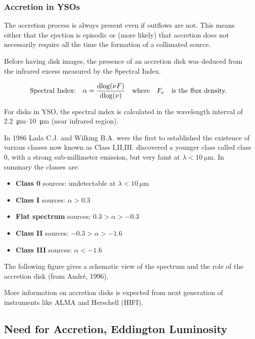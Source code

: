 \documentclass[10pt,a4paper,english]{article}
\begin{document}
\subsubsection{Accretion in YSOs}

The accretion process is always present even if outflows are not. This means
either that the ejection is episodic or (more likely) that accretion does not
necessarily require all the time the formation of a collimated source.

Before having disk images, the presence of an accretion disk was deduced from
the infrared excess measured by the Spectral Index.

\[
    \text{Spectral Index:}\quad \alpha=\frac{\mathrm{d}{\log(\nu F)}}{\mathrm{d}{
    \log(\nu)}}\quad\text{where}\quad F_{\nu}\quad\text{is the flux density.}
\]


For disks in YSO, the spectral index is calculated in the wavelength interval
of \SIrange{2.2}{10}{\um} (near infrared region).

In 1986 Lada C.J. and Wilking B.A. were the first to established the existence
of various classes now known as Class I,II,III. \cite{1993ApJ...406..122A}
discovered a younger class called class 0, with a strong sub-millimeter
emission, but very faint at $\lambda<\SI{10}{\um}$. In summary the classes are:
\begin{itemize}
    \item \textbf{Class 0} sources: undetectable at $\lambda<\SI{10}{\um}$
    \item \textbf{Class I} sources: $\alpha>0.3$
    \item \textbf{Flat spectrum} sources: $0.3>\alpha>-0.3$
    \item \textbf{Class II} sources: $-0.3>\alpha>-1.6$
    \item \textbf{Class III} sources: $\alpha<-1.6$
\end{itemize}

The following figure gives a schematic view of the spectrum and the role of the
accretion disk (from André, 1996).


More information on accretion disks is expected from next generation of
instruments like ALMA and Herschell (HIFI).

\subsection{Need for Accretion, Eddington Luminosity}
\end{document}
